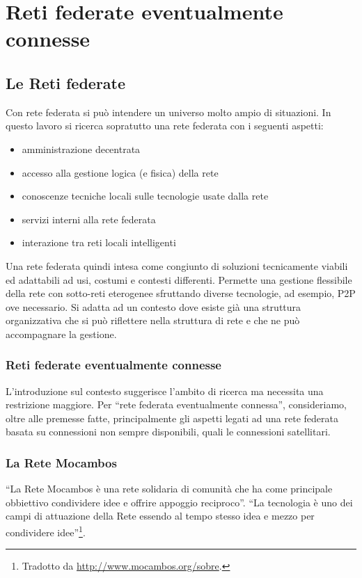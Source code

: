 
\chapter{Reti federate eventualmente connesse}
\label{Capitolo2}

\section{Le Reti federate}
Con rete federata si può intendere un universo molto ampio di
situazioni. In questo lavoro si ricerca sopratutto una rete federata
con i seguenti aspetti:

\begin{itemize}
  \item amministrazione decentrata 
  \item accesso alla gestione logica (e fisica) della rete
  \item conoscenze tecniche locali sulle tecnologie usate dalla rete
  \item servizi interni alla rete federata
  \item interazione tra reti locali intelligenti
\end{itemize} 

Una rete federata quindi intesa come congiunto di soluzioni
tecnicamente viabili ed adattabili ad usi, costumi e contesti
differenti. Permette una gestione flessibile della rete con sotto-reti
eterogenee sfruttando diverse tecnologie, ad esempio, P2P ove
necessario. Si adatta ad un contesto dove esiste già una struttura
organizzativa che si può riflettere nella struttura di rete e che ne
può accompagnare la gestione.

\subsection{Reti federate eventualmente connesse}
L'introduzione sul contesto suggerisce l'ambito di ricerca ma
necessita una restrizione maggiore. Per ``rete
federata eventualmente connessa'', consideriamo, oltre alle premesse
fatte, principalmente gli aspetti legati ad una rete federata basata
su connessioni non sempre disponibili, quali le connessioni
satellitari.

\subsection{La Rete Mocambos}
\label{sec:ReteMocambos}
``La Rete Mocambos è una rete solidaria di comunità che ha come
principale obbiettivo condividere idee e offrire appoggio reciproco''.
``La tecnologia è uno dei campi di attuazione della Rete essendo al
tempo stesso idea e mezzo per condividere idee''\footnote{Tradotto da
  \url{http://www.mocambos.org/sobre}.}.

